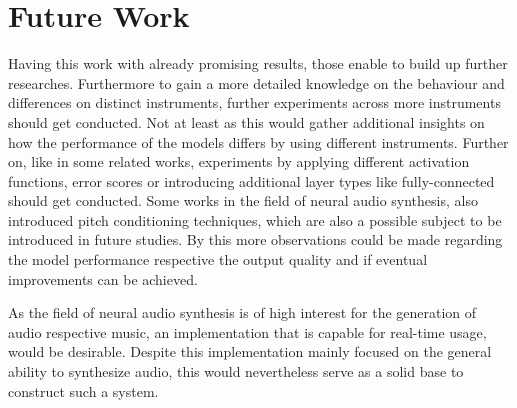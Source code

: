 \section{Future Work}
Having this work with already promising results, those enable to build up further researches. Furthermore to gain a more detailed knowledge on the behaviour and differences on distinct instruments, further experiments across more instruments should get conducted. Not at least as this would gather additional insights on how the performance of the models differs by using different instruments. Further on, like in some related works, experiments by applying different activation functions, error scores or introducing additional layer types like fully-connected should get conducted. Some works in the field of neural audio synthesis, also introduced pitch conditioning techniques, which are also a possible subject to be introduced in future studies. By this more observations could be made regarding the model performance respective the output quality and if eventual improvements can be achieved.

As the field of neural audio synthesis is of high interest for the generation of audio respective music, an implementation that is capable for real-time usage, would be desirable. Despite this implementation mainly focused on the general ability to synthesize audio, this would nevertheless serve as a solid base to construct such a system.